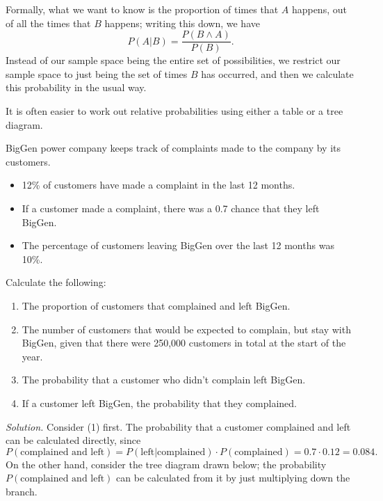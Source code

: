 Formally, what we want to know is the proportion of times that $ A $ happens, out of all the times that $ B $ happens; writing
this down, we have
\begin{displaymath}
  P(A | B) = \frac{P(B \wedge A)}{P(B)}.
\end{displaymath}
Instead of our sample space being the entire set of possibilities, we restrict our sample space to just being the set of times $ B $
has occurred, and then we calculate this probability in the usual way.

It is often easier to work out relative probabilities using either a table or a tree diagram.

\begin{ex}[NZQA, 2012]
  BigGen power company keeps track of complaints made to the company by its customers.
  \begin{itemize}
    \item 12\% of customers have made a complaint in the last 12 months.
    \item If a customer made a complaint, there was a 0.7 chance that they left BigGen.
    \item The percentage of customers leaving BigGen over the last 12 months was 10\%.
  \end{itemize}
  Calculate the following:
  \begin{enumerate}
    \item The proportion of customers that complained and left BigGen.
    \item The number of customers that would be expected to complain, but stay with BigGen, given that there were 250,000 customers in total at the start of the year.
    \item The probability that a customer who didn’t complain left BigGen.
    \item If a customer left BigGen, the probability that they complained.
  \end{enumerate}

  \textit{Solution.}
  Consider (1) first. The probability that a customer complained and left can be calculated directly, since
  \begin{displaymath}
    P(\text{complained and left}) = P(\text{left} | \text{complained}) \cdot P(\text{complained}) = 0.7 \cdot 0.12 = 0.084.
  \end{displaymath}
  On the other hand, consider the tree diagram drawn below; the probability $ P(\text{complained and left}) $ can be calculated
  from it by just multiplying down the branch.


\end{ex}
